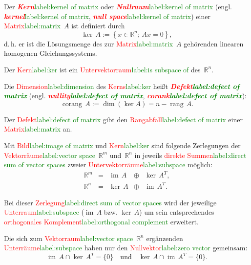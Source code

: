 \documentclass[a4paper,twoside,english,ngerman,deutsch,german,sectrefs,envcountsame,envcountchap]{svmono}
\newcommand{\setref}[2]{\textcolor{red}{#1}\textcolor{green}{#2}}
\begin{document}
Der \setref{\textbf{\em Kern}}{label:kernel of matrix} oder \setref{\textbf{\em Nullraum}}{label:kernel of matrix} (engl. \setref{\textbf{\em kernel}}{label:kernel of matrix}, \setref{\textbf{\em null space}}{label:kernel of matrix}) einer \setref{Matrix}{label:matrix}~$A$ ist definiert durch
\[
\ker\,A:=\left\{ x\in{\mathbb{R}}^{n};\,Ax=0\right\} ,
\]
d.\,h. er ist die Lösungsmenge des zur \setref{Matrix}{label:matrix}~$A$ gehörenden linearen homogenen Gleichungssystems.

Der \setref{Kern}{label:ker} ist ein \setref{Untervektorraum}{label:is subspace of} des~$\mathbb{R}^{n}$.

Die \setref{Dimension}{label:dimension} des \setref{Kerns}{label:ker} heißt \textbf{\em \setref{Defekt}{label:defect of matrix}} (engl. \textbf{\em \setref{nullity}{label:defect of matrix}},
\textbf{\em \setref{corank}{label:defect of matrix}}):
\begin{equation}
{\operatorname{corang}}\,A:=\dim(\ker A)=n-{\operatorname{rang}}\,A.\label{eq:corank}
\end{equation}

Der \setref{Defekt}{label:defect of matrix} gibt den \setref{Rangabfall}{label:defect of matrix} einer \setref{Matrix}{label:matrix} an.

Mit \setref{Bild}{label:image of matrix} und \setref{Kern}{label:ker} sind folgende Zerlegungen der \setref{Vektorräume}{label:vector space}~${\mathbb{R}}^{m}$ und~${\mathbb{R}}^{n}$ in jeweils \setref{direkte Summen}{label:direct sum of vector spaces} zweier \setref{Untervektorräume}{label:subspace} möglich:
\begin{equation}
\begin{array}{lcccc}
{\mathbb{R}}^{m} & = & {\operatorname{im}}\,A & \oplus & \ker\,A^{T},\\ {\mathbb{R}}^{n} & = & \ker\,A & \oplus & {\operatorname{im}}\,A^{T}.
\end{array}\label{eq:zerleg-im-ker}
\end{equation}

Bei dieser \setref{Zerlegung}{label:direct sum of vector spaces} wird der jeweilige \setref{Unterraum}{label:subspace} (${\operatorname{im}}\,A$ bzw. $\ker\,A$) um sein entsprechendes \setref{orthogonales Komplement}{label:orthogonal complement} erweitert.

Die sich zum \setref{Vektorraum}{label:vector space}~${\mathbb{R}}^{n}$ ergänzenden \setref{Unterräume}{label:subspace} haben nur den \setref{Nullvektor}{label:zero vector} gemeinsam:
\[
{\operatorname{im}}\,A\cap\ker\,A^{T}=\{0\}\quad\text{und}\quad\ker\,A\cap{\operatorname{im}}\,A^{T}=\{0\}.
\]
\end{document}
